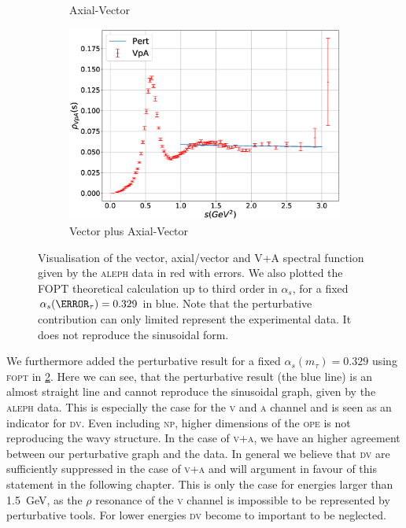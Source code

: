 \documentclass[../../index.tex]{subfiles}
\begin{document}
\begin{figure}
\begin{subfigure}[b]{0.49\textwidth}
    \caption{Axial-Vector}
    \label{fig:alephA}
  \end{subfigure}
  \begin{subfigure}[b]{\textwidth}
    \centering
    \includegraphics[width=\textwidth]{./images/specFuncAleph_VpA.eps}
    \caption{Vector plus Axial-Vector}
    \label{fig:alephVPlusA}
  \end{subfigure}
  \caption{Visualisation of the vector, axial\-/vector and V+A spectral function
    given by the \textsc{aleph} data \cite{Davier2013} in red with errors. We
    also plotted the \textsc{FOPT} theoretical calculation up to third order in
    \(\alpha_s\), for a fixed \(\alpha_s(\m_\tau)=0.329\) in blue. Note that the
    perturbative contribution can only limited represent the experimental data.
    It does not reproduce the sinusoidal form.}
  \label{fig:aleph}
\end{figure}

We furthermore added the perturbative result for a fixed
\(\alpha_s(m_\tau)=0.329\) using \textsc{fopt} in \cref{fig:alephVPlusA}. Here
we can see, that the perturbative result (the blue line) is an almost straight
line and cannot reproduce the sinusoidal graph, given by the \textsc{aleph}
data. This is especially the case for the \textsc{v} and \textsc{a} channel and
is seen as an indicator for \textsc{dv}. Even including \textsc{np}, higher
dimensions of the \textsc{ope} is not reproducing the wavy structure. In the
case of \textsc{v+a}, we have an higher agreement between our perturbative graph
and the data. In general we believe that \textsc{dv} are sufficiently suppressed
in the case of \textsc{v+a} and will argument in favour of this statement in the
following chapter. This is only the case for energies larger than
\SI{1.5}{\giga\eV}, as the \(\rho\) resonance of the \textsc{v} channel is
impossible to be represented by perturbative tools. For lower energies
\textsc{dv} become to important to be neglected.
\end{document}

